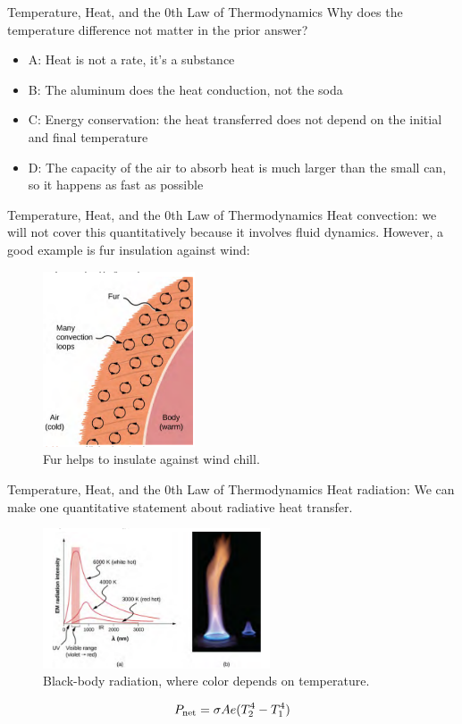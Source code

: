 \documentclass{beamer}
\begin{document}
\begin{frame}{Temperature, Heat, and the 0th Law of Thermodynamics}
Why does the temperature difference not matter in the prior answer?
\begin{itemize}
\item A: Heat is not a rate, it's a substance
\item B: The aluminum does the heat conduction, not the soda
\item C: Energy conservation: the heat transferred does not depend on the initial and final temperature
\item D: The capacity of the air to absorb heat is much larger than the small can, so it happens as fast as possible
\end{itemize}
\end{frame}

\begin{frame}{Temperature, Heat, and the 0th Law of Thermodynamics}
Heat convection: we will not cover this quantitatively because it involves fluid dynamics. However, a good example is fur insulation against wind:
\begin{figure}
\centering
\includegraphics[width=0.4\textwidth,trim=0cm 0.1cm 0cm 0.1cm,clip=true]{figures/heat2.png}
\caption{\label{fig:heat2} Fur helps to insulate against wind chill.}
\end{figure}
\end{frame}

\begin{frame}{Temperature, Heat, and the 0th Law of Thermodynamics}
\small
Heat radiation: We can make one quantitative statement about radiative heat transfer.
\begin{figure}
\centering
\includegraphics[width=0.6\textwidth]{figures/heat3.png}
\caption{\label{fig:heat3} Black-body radiation, where color depends on temperature.}
\end{figure}
\begin{equation}
P_{\rm net} = \sigma A e (T_{\rm 2}^4 - T_{\rm 1}^4)
\end{equation}
\end{frame}
\end{document}
